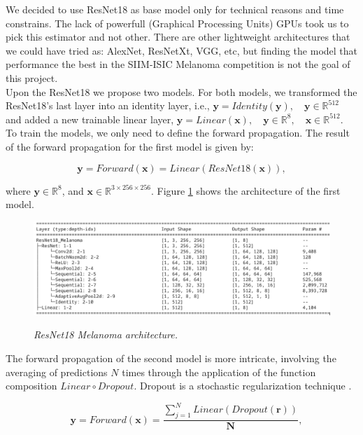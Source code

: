 We decided to use ResNet18 as base model only for technical reasons and time
constrains. The lack of powerfull (Graphical Processing Units) GPUs took us to pick this estimator and not
other. There are other lightweight architectures that we could have tried as:
AlexNet, ResNetXt, VGG, etc, but finding the model that performance the best in
the SIIM-ISIC Melanoma competition is not the goal of this project. \\

Upon the ResNet18 we propose two models. For both models, we transformed the
ResNet18's last layer into an identity layer, i.e., \(\mathbf{y} =
Identity(\mathbf{y}), \quad \mathbf{y} \in \mathbb{R}^{512}\) and added a new
trainable linear layer, \(\mathbf{y} = Linear(\mathbf{x}), \quad \mathbf{y} \in
\mathbb{R}^8, \quad \mathbf{x} \in \mathbb{R}^{512}\). \\

To train the models, we only need to define the forward propagation. The result
of the forward propagation for the first model is given by:

\[ \mathbf{y} = Forward(\mathbf{x}) = Linear(ResNet18(\mathbf{x})), \]

where \( \mathbf{y} \in \mathbb{R}^8 \), and \( \mathbf{x}  \in
\mathbb{R}^{3 \times 256 \times 256} \). Figure \ref{fig:resnet-18-melanoma-arch} shows
the architecture of the first model.

\begin{figure}[H]
  \centering
  \includegraphics[width=\textwidth]{imatges/methodological_contribution/ResNet18_Melanoma.png}
  \caption[ResNet18\_Melanoma architecture]{\textit{ResNet18 Melanoma architecture.}}
  {\label{fig:resnet-18-melanoma-arch}}
\end{figure}

The forward propagation of the second model is more intricate, involving the
averaging of predictions \(N\) times through the application of the function
composition \(Linear \circ Dropout\). Dropout is a stochastic regularization
technique \cite{DropoutPaper}.

\[ \quad \mathbf{y} = Forward(\mathbf{x}) = \frac{\sum_{j=1}^{N} Linear(Dropout(\mathbf{r}))}{\mathbf{N}}, \]

